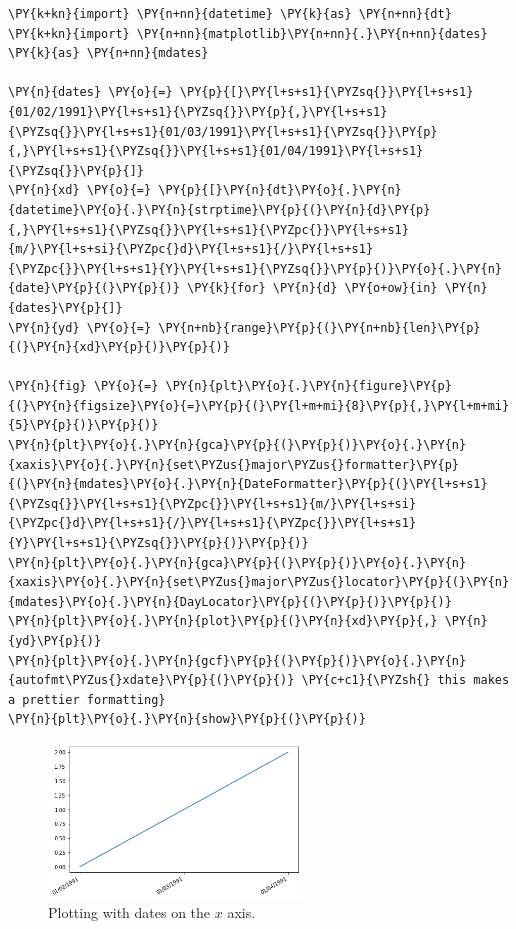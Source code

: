 \begin{tcolorbox}[breakable, size=fbox, boxrule=1pt, pad at break*=1mm,colback=cellbackground, colframe=cellborder]
\begin{Verbatim}[commandchars=\\\{\}]
\PY{k+kn}{import} \PY{n+nn}{datetime} \PY{k}{as} \PY{n+nn}{dt}
\PY{k+kn}{import} \PY{n+nn}{matplotlib}\PY{n+nn}{.}\PY{n+nn}{dates} \PY{k}{as} \PY{n+nn}{mdates}
	
\PY{n}{dates} \PY{o}{=} \PY{p}{[}\PY{l+s+s1}{\PYZsq{}}\PY{l+s+s1}{01/02/1991}\PY{l+s+s1}{\PYZsq{}}\PY{p}{,}\PY{l+s+s1}{\PYZsq{}}\PY{l+s+s1}{01/03/1991}\PY{l+s+s1}{\PYZsq{}}\PY{p}{,}\PY{l+s+s1}{\PYZsq{}}\PY{l+s+s1}{01/04/1991}\PY{l+s+s1}{\PYZsq{}}\PY{p}{]}
\PY{n}{xd} \PY{o}{=} \PY{p}{[}\PY{n}{dt}\PY{o}{.}\PY{n}{datetime}\PY{o}{.}\PY{n}{strptime}\PY{p}{(}\PY{n}{d}\PY{p}{,}\PY{l+s+s1}{\PYZsq{}}\PY{l+s+s1}{\PYZpc{}}\PY{l+s+s1}{m/}\PY{l+s+si}{\PYZpc{}d}\PY{l+s+s1}{/}\PY{l+s+s1}{\PYZpc{}}\PY{l+s+s1}{Y}\PY{l+s+s1}{\PYZsq{}}\PY{p}{)}\PY{o}{.}\PY{n}{date}\PY{p}{(}\PY{p}{)} \PY{k}{for} \PY{n}{d} \PY{o+ow}{in} \PY{n}{dates}\PY{p}{]}
\PY{n}{yd} \PY{o}{=} \PY{n+nb}{range}\PY{p}{(}\PY{n+nb}{len}\PY{p}{(}\PY{n}{xd}\PY{p}{)}\PY{p}{)}
	
\PY{n}{fig} \PY{o}{=} \PY{n}{plt}\PY{o}{.}\PY{n}{figure}\PY{p}{(}\PY{n}{figsize}\PY{o}{=}\PY{p}{(}\PY{l+m+mi}{8}\PY{p}{,}\PY{l+m+mi}{5}\PY{p}{)}\PY{p}{)}
\PY{n}{plt}\PY{o}{.}\PY{n}{gca}\PY{p}{(}\PY{p}{)}\PY{o}{.}\PY{n}{xaxis}\PY{o}{.}\PY{n}{set\PYZus{}major\PYZus{}formatter}\PY{p}{(}\PY{n}{mdates}\PY{o}{.}\PY{n}{DateFormatter}\PY{p}{(}\PY{l+s+s1}{\PYZsq{}}\PY{l+s+s1}{\PYZpc{}}\PY{l+s+s1}{m/}\PY{l+s+si}{\PYZpc{}d}\PY{l+s+s1}{/}\PY{l+s+s1}{\PYZpc{}}\PY{l+s+s1}{Y}\PY{l+s+s1}{\PYZsq{}}\PY{p}{)}\PY{p}{)}
\PY{n}{plt}\PY{o}{.}\PY{n}{gca}\PY{p}{(}\PY{p}{)}\PY{o}{.}\PY{n}{xaxis}\PY{o}{.}\PY{n}{set\PYZus{}major\PYZus{}locator}\PY{p}{(}\PY{n}{mdates}\PY{o}{.}\PY{n}{DayLocator}\PY{p}{(}\PY{p}{)}\PY{p}{)}
\PY{n}{plt}\PY{o}{.}\PY{n}{plot}\PY{p}{(}\PY{n}{xd}\PY{p}{,} \PY{n}{yd}\PY{p}{)}
\PY{n}{plt}\PY{o}{.}\PY{n}{gcf}\PY{p}{(}\PY{p}{)}\PY{o}{.}\PY{n}{autofmt\PYZus{}xdate}\PY{p}{(}\PY{p}{)} \PY{c+c1}{\PYZsh{} this makes a prettier formatting}
\PY{n}{plt}\PY{o}{.}\PY{n}{show}\PY{p}{(}\PY{p}{)}
\end{Verbatim}
\end{tcolorbox}

\begin{figure}[h]
	\centering
	\includegraphics[width=0.6\textwidth]{figures/axis3}
	\caption{Plotting with dates on the $x$ axis.}
	\label{fig:axis3}
\end{figure}

